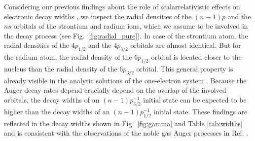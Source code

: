 Considering our previous findings about the role
of scalarrelativistic effects on electronic decay widths \cite{Fasshauer15_1},
we inspect the radial densities of the $(n-1)p$ and the $ns$ orbitals of the
strontium and radium ions,
which we assume to be involved in the decay process (see
Fig.~\ref{fig:radial_pure}).
In case of the strontium atom, the radial densities of the $4p_{1/2}$ and the
$4p_{3/2}$ orbitals are almost identical. But for the radium atom, the radial
density of the  $6p_{1/2}$ orbital is located closer to the nucleus than
the radial density of the $6p_{3/2}$ orbital. This general property is already
visible in the analytic solutions of the one-electron system \cite{Bethe_Salpeter}.
Because the Auger decay rates depend crucially depend on the overlap of the
involved orbitals, the decay widths of an $(n-1)p_{3/2}^{-1}$ initial state
can be expected to be higher than the decay widths of an $(n-1)p_{1/2}^{-1}$
initial state. These findings are reflected in the decay widths shown in
Fig.~\ref{fig:gamma} and Table \ref{tab:widths} and is consistent with the
observations of the noble gas Auger processes in Ref. \cite{Fasshauer15_1}.


